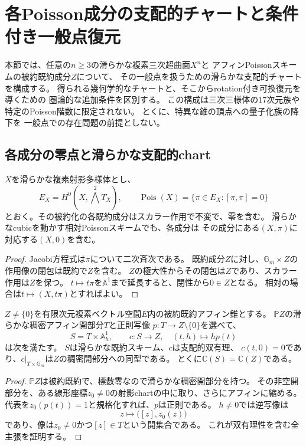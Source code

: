 \section{各Poisson成分の支配的チャートと条件付き一般点復元}
\label{sec:all-poisson-components}

本節では、任意の$n\ge3$の滑らかな複素三次超曲面$X^n$と
アフィンPoissonスキームの被約既約成分$Z$について、
その一般点を扱うための滑らかな支配的チャートを構成する。
得られる幾何学的なチャートと、そこからrotation付き可換復元を導くための
圏論的な追加条件を区別する。
この構成は三次三様体の17次元族や特定のPoisson階数に限定されない。
とくに、特異な錐の頂点への量子化族の降下を
一般点での存在問題の前提としない。

\subsection{各成分の零点と滑らかな支配的chart}

\begin{proposition}[Poisson錐の成分と零点]
\label{prop:all-components-cone}
$X$を滑らかな複素射影多様体とし、
\[
 E_X=H^0(X,\textstyle\bigwedge^2T_X),\qquad
 \operatorname{Pois}(X)=\{\pi\in E_X:[\pi,\pi]=0\}
\]
とおく。その被約化の各既約成分はスカラー作用で不変で、零を含む。
滑らかなcubicを動かす相対Poissonスキームでも、各成分は
その成分にある$(X,\pi)$に対応する$(X,0)$を含む。
\end{proposition}
\begin{proof}
Jacobi方程式は$\pi$について二次斉次である。
既約成分$Z$に対し、$\mathbb G_m\times Z$の作用像の閉包は既約で$Z$を含む。
$Z$の極大性からその閉包は$Z$であり、スカラー作用は$Z$を保つ。
$t\mapsto t\pi$を$\mathbb A^1$まで延長すると、閉性から$0\in Z$となる。
相対の場合は$t\mapsto(X,t\pi)$とすればよい。
\end{proof}

\begin{theorem}[滑らかなスカラーchart]
\label{cw:thm:chart}
$Z\ne\{0\}$を有限次元複素ベクトル空間$E$内の被約既約アフィン錐とする。
$\mathbb PZ$の滑らかな稠密アフィン開部分$T$と正則写像
$p:T\to Z\setminus\{0\}$を選べて、
\[
 S=T\times\mathbb A^1_h,\qquad
 c:S\longrightarrow Z,\quad (t,h)\longmapsto h p(t)
 \tag{C}\label{cw:eq:contraction}
\]
は次を満たす。
$S$は滑らかな既約スキーム、$c$は支配的双有理、
$c(t,0)=0$であり、$c|_{T\times\mathbb G_m}$は$Z$の稠密開部分への同型である。
とくに$\mathbb C(S)=\mathbb C(Z)$である。
\end{theorem}
\begin{proof}
$\mathbb PZ$は被約既約で、標数零なので滑らかな稠密開部分を持つ。
その非空開部分を、ある線形座標$z_0\ne0$の射影chartの中に取り、さらにアフィンに縮める。
代表を$z_0(p(t))=1$と規格化すれば、$p$は正則である。
$h\ne0$では逆写像は
\[
 z\longmapsto\bigl([z],z_0(z)\bigr)
\]
であり、像は$z_0\ne0$かつ$[z]\in T$という開集合である。
これが双有理性を含む全主張を証明する。
\end{proof}

